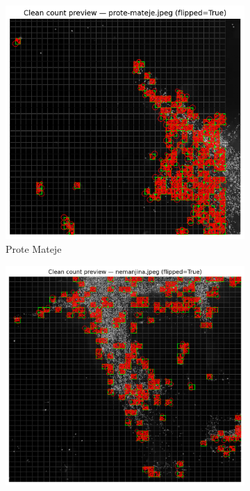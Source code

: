 \documentclass[a4paper,12pt]{article}
\begin{document}
\begin{figure}[H]
	\centering
  
	\begin{subfigure}[b]{0.3\textwidth}
	  \centering
	  \includegraphics[width=\textwidth]{../outputs/sampling_outputs/previews_images_main/prote-mateje_pilot_clean_count_preview.png}
	  \caption{Prote Mateje}
	  \label{fig:prote-mateje}
	\end{subfigure}
	\hfill
	\begin{subfigure}[b]{0.3\textwidth}
	  \centering
	  \includegraphics[width=\textwidth]{../outputs/sampling_outputs/previews_images_main/nemanjina_pilot_clean_count_preview.png}

\end{subfigure}
\end{figure}
\end{document}
